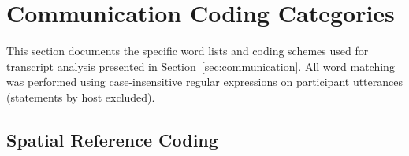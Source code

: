 

\section{Communication Coding Categories}\label{appendix:coding_categories}

This section documents the specific word lists and coding schemes used for transcript analysis presented in Section~\ref{sec:communication}. All word matching was performed using case-insensitive regular expressions on participant utterances (statements by host excluded).

\subsection{Spatial Reference Coding}

